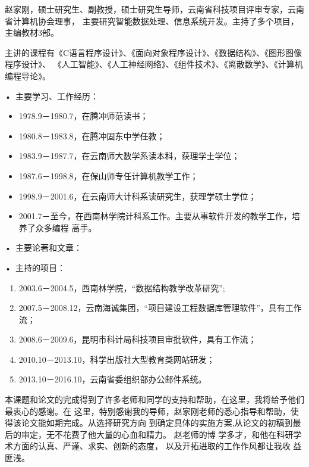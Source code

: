\documentclass{swfuthesism}
\begin{document}
\begin{advisorInfo}
  赵家刚，硕士研究生、副教授，硕士研究生导师，云南省科技项目评审专家，云南省计算机协会理事，
  主要研究智能数据处理、信息系统开发。主持了多个项目，主编教材3部。

  主讲的课程有《C语言程序设计》、《面向对象程序设计》、《数据结构》、《图形图像程序设计》、
  《人工智能》、《人工神经网络》、《组件技术》、《离散数学》、《计算机编程导论》。

  \noindent{}•\, 主要学习、工作经历：
  \begin{itemize}
  \item[] 1978.9－1980.7，在腾冲师范读书；
  \item[] 1980.8－1983.8，在腾冲固东中学任教；
  \item[] 1983.9－1987.7，在云南师大数学系读本科，获理学士学位；
  \item[] 1987.6－1998.8，在保山师专任计算机教学工作；
  \item[] 1998.9－2001.6，在云南师大计科系读研究生，获理学硕士学位；
  \item[] 2001.7－至今，在西南林学院计科系工作。主要从事软件开发的教学工作，培养了众多编程
    高手。
  \end{itemize}

  \noindent{}•\, 主要论著和文章：
  \begin{refsection}
    \nocite{zjg02,zjg03,zjg07,zjg09,zjg09-2,zjg09-3,zjg09-4,zjg10,zjg11,zjg13}
    \printbibliography[heading=none]
  \end{refsection}

  \noindent{}•\, 主持的项目：
  \begin{enumerate}
  \item 2003.6－2004.5，西南林学院，``数据结构教学改革研究'';
  \item 2007.5－2008.12，云南海诚集团，``项目建设工程数据库管理软件''，具有工作流；
  \item 2008.6－2009.6，昆明市科计局科技项目审批软件，具有工作流；
  \item 2010.10－2013.10，科学出版社大型教育类网站研发；
  \item 2013.10－2016.10，云南省委组织部办公邮件系统。
  \end{enumerate}
\end{advisorInfo}


\begin{acknowledgment}
  本课题和论文的完成得到了许多老师和同学的支持和帮助，在这里，我将给予他们最衷心的感谢。在
  这里，特别感谢我的导师，赵家刚老师的悉心指导和帮助，使得该论文能如期完成。从选择研究方向
  到确定具体的实施方案,从论文的初稿到最后的审定，无不花费了他大量的心血和精力。 赵老师的博
  学多才，和他在科研学术方面的认真、严谨、求实、创新的态度， 以及开拓进取的工作作风都让我收
  益匪浅。
\end{acknowledgment}
\end{document}
